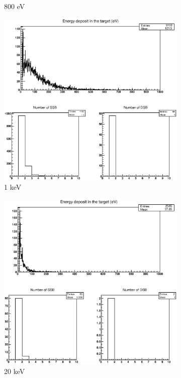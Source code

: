 \begin{figure}
\begin{subfigure}{.5\textwidth}
  \caption{800 eV}
  \label{fig:subei5}
\end{subfigure}%
\begin{subfigure}{.5\textwidth}
  \centering
  \includegraphics[width=.78\linewidth]{./Figures/e1kev.eps}
  \caption{1 keV}
  \label{fig:subei6}
\end{subfigure}
\begin{subfigure}{.5\textwidth}
  \centering
  \includegraphics[width=.78\linewidth]{./Figures/e20kev.eps}
  \caption{20 keV}
  \label{fig:subei7}
\end{subfigure}%
\begin{subfigure}{.5\textwidth}
  \centering

\end{subfigure}
\end{figure}
